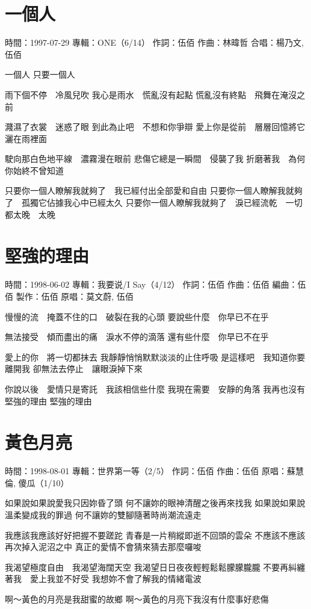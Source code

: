 \documentclass[UTF8,a4paper,oneside,twocolumn,12pt]{ctexbook}
\newcommand{\infopair}[2]{\textbullet #1：#2}
\newcommand{\zc}[1][伍佰]{\infopair{作詞}{#1}}
\newcommand{\zq}[1][伍佰]{\infopair{作曲}{#1}}
\newcommand{\bq}[1][伍佰]{\infopair{編曲}{#1}}
\newcommand{\zj}[1]{\infopair{專輯}{#1}}
\newcommand{\zz}[1]{\infopair{製作}{#1}}
\newcommand{\yc}[1]{\infopair{原唱}{#1}}
\newcommand{\sj}[1]{\infopair{時間}{#1}}
\newenvironment{info}{\begin{flushleft}\kaishu
	}
	{\end{flushleft}\normalsize\yahei\par}
\newenvironment{lyric}{
	}
{}
\begin{document}
\section{一個人}
\begin{info}
	\sj{1997-07-29}
	\zj{ONE（6/14）}
	\zc
	\zq[林暐哲]
	\infopair{合唱}{楊乃文, 伍佰}
\end{info}
\begin{lyric}
	一個人 只要一個人

	雨下個不停　冷風兒吹
	我心是雨水　慌亂沒有起點
	慌亂沒有終點　飛舞在淹沒之前

	濺濕了衣裳　迷惑了眼
	到此為止吧　不想和你爭辯
	愛上你是從前　層層回憶將它灑在雨裡面

	駛向那白色地平線　濃霧漫在眼前
	悲傷它總是一瞬間　侵襲了我
	折磨著我　為何你始終不曾知道

	只要你一個人瞭解我就夠了　我已經付出全部愛和自由
	只要你一個人瞭解我就夠了　孤獨它佔據我心中已經太久
	只要你一個人瞭解我就夠了　淚已經流乾　一切都太晚　太晚
\end{lyric}

\section{堅強的理由}
\begin{info}
	\sj{1998-06-02}
	\zj{我要说/I Say（4/12）}
	\zc
	\zq
	\bq[伍佰]
	\zz{伍佰}
	\infopair{原唱}{莫文蔚, 伍佰}
\end{info}
\begin{lyric}
	慢慢的流　掩蓋不住的口　破裂在我的心頭
	要說些什麼　你早已不在乎

	無法接受　傾而盡出的痛　淚水不停的滴落
	還有些什麼　你早已不在乎

	愛上的你　將一切都抹去
	我靜靜悄悄默默淡淡的止住呼吸
	是這樣吧　我知道你要離開我
	卻無法去停止　讓眼淚掉下來

	你說以後　愛情只是寄託　我該相信些什麼
	我現在需要　安靜的角落
	我再也沒有　堅強的理由
	堅強的理由
\end{lyric}

\section{黃色月亮}
\begin{info}
	\sj{1998-08-01}
	\zj{世界第一等（2/5）}
	\zc
	\zq
	\yc{蘇慧倫, 傻瓜（1/10）}
\end{info}
\begin{lyric}
	如果說如果說愛我只因妳昏了頭  何不讓妳的眼神清醒之後再來找我
	如果說如果說溫柔變成我的罪過  何不讓妳的雙腳隨著時尚潮流遠走

	我應該我應該好好把握不要蹉跎  青春是一片稍縱即逝不回頭的雲朵
	不應該不應該再次掉入泥沼之中  真正的愛情不會猜來猜去那麼囉唆

	我渴望極度自由　我渴望海闊天空  我渴望日日夜夜輕輕鬆鬆朦朦朧朧
	不要再糾纏著我　愛上我並不好受  我想妳不會了解我的情緒電波

	啊～黃色的月亮是我甜蜜的故鄉  啊～黃色的月亮下我沒有什麼事好悲傷
\end{lyric}
\end{document}
